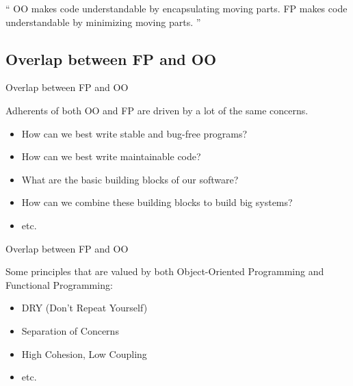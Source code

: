 \documentclass{beamer}
\begin{document}
\begin{frame}

  \begin{exampleblock}{}
    {\Large ``
      OO makes code understandable by encapsulating
      moving parts.
      FP makes code understandable by minimizing moving
      parts.
      ''}
    \vskip5mm
    \hspace*{}
  \end{exampleblock}

\end{frame}

\subsection{Overlap between FP and OO}

\begin{frame}{Overlap between FP and OO}

  {\Large Adherents of both OO and FP are driven by a lot of the same
    concerns.}

  \begin{itemize}[<+->]
  \item {\Large How can we best write stable and bug-free programs?}
  \item {\Large How can we best write maintainable code?}
  \item {\Large What are the basic building blocks of our software?}
  \item {\Large How can we combine these building blocks to build big
    systems?}
  \item etc.
  \end{itemize}

\end{frame}


\begin{frame}{Overlap between FP and OO}

  {\Large Some principles that are valued by both Object-Oriented
    Programming and Functional Programming:}

  \begin{itemize}[<+->]
  \item DRY (Don't Repeat Yourself)
  \item Separation of Concerns
  \item High Cohesion, Low Coupling
  \item etc.
  \end{itemize}

\end{frame}
\end{document}
